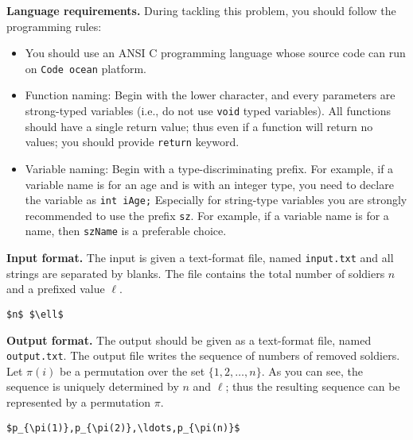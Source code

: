 \documentclass{article}
\newcommand{\M}[2]{{\mathfrak{M}_{#1\times #2}}}
\begin{document}
\bigskip
\noindent\textbf{Language requirements. }%
During tackling this problem, you should follow the programming rules:
\begin{itemize}
\item You should use an ANSI C programming language whose source code can run on \texttt{Code ocean} platform. 
\item Function naming: Begin with the lower character, and every parameters are strong-typed variables (i.e., do not use \texttt{void} typed variables).
	All functions should have a single return value; thus even if a function will return no values; you should provide \texttt{return} keyword.
\item Variable naming: Begin with a type-discriminating prefix. For example, if a variable name is for an age and is with an integer type,
	you need to declare the variable as \texttt{int iAge;}  Especially for string-type variables you are strongly recommended to use the prefix \texttt{sz}.
	For example, if a variable name is for a name, then \texttt{szName} is a preferable choice.
\end{itemize}


\bigskip
\noindent\textbf{Input format.} %
The input is given a text-format file, named \texttt{input.txt} and all strings are separated by blanks.
The file contains the total number of soldiers $n$ and a prefixed value $\ell$. 
\begin{lstlisting}[backgroundcolor=\color{yellow!40}]
$n$ $\ell$
\end{lstlisting}



\bigskip
\noindent\textbf{Output format.} %
The output should be given as a text-format file, named \texttt{output.txt}.
The output file writes the sequence of numbers of removed soldiers.
Let $\pi(i)$ be a permutation  over the set $\{1,2,\ldots,n\}$. As you can see,
the sequence is uniquely determined by $n$ and $\ell$; thus 
the resulting sequence can be represented by a permutation $\pi$.
\begin{lstlisting}[backgroundcolor=\color{yellow!40}]
$p_{\pi(1)},p_{\pi(2)},\ldots,p_{\pi(n)}$
\end{lstlisting}
\end{document}
